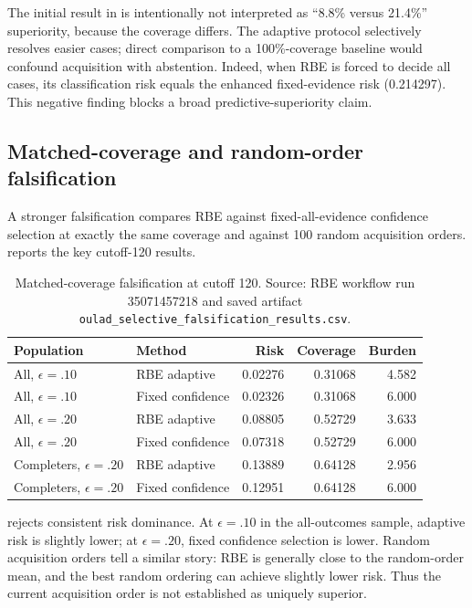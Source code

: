 \documentclass[11pt]{article}
\begin{document}
The initial result in  is intentionally not interpreted as ``8.8\% versus 21.4\%'' superiority, because the coverage differs. The adaptive protocol selectively resolves easier cases; direct comparison to a 100\%-coverage baseline would confound acquisition with abstention. Indeed, when RBE is forced to decide all cases, its classification risk equals the enhanced fixed-evidence risk (0.214297). This negative finding blocks a broad predictive-superiority claim.

\subsection{Matched-coverage and random-order falsification}
A stronger falsification compares RBE against fixed-all-evidence confidence selection at exactly the same coverage and against 100 random acquisition orders.  reports the key cutoff-120 results.

\begin{table}[t]
\centering
\caption{Matched-coverage falsification at cutoff 120. Source: RBE workflow run 35071457218 and saved artifact \texttt{oulad\_selective\_falsification\_results.csv}.}
\label{tab:falsification}
\small
\begin{tabular}{llrrr}
\toprule
Population & Method & Risk & Coverage & Burden \\
\midrule
All, $\epsilon=.10$ & RBE adaptive & 0.02276 & 0.31068 & 4.582 \\
All, $\epsilon=.10$ & Fixed confidence & 0.02326 & 0.31068 & 6.000 \\
All, $\epsilon=.20$ & RBE adaptive & 0.08805 & 0.52729 & 3.633 \\
All, $\epsilon=.20$ & Fixed confidence & 0.07318 & 0.52729 & 6.000 \\
Completers, $\epsilon=.20$ & RBE adaptive & 0.13889 & 0.64128 & 2.956 \\
Completers, $\epsilon=.20$ & Fixed confidence & 0.12951 & 0.64128 & 6.000 \\
\bottomrule
\end{tabular}
\end{table}

 rejects consistent risk dominance. At $\epsilon=.10$ in the all-outcomes sample, adaptive risk is slightly lower; at $\epsilon=.20$, fixed confidence selection is lower. Random acquisition orders tell a similar story: RBE is generally close to the random-order mean, and the best random ordering can achieve slightly lower risk. Thus the current acquisition order is not established as uniquely superior.
\end{document}
